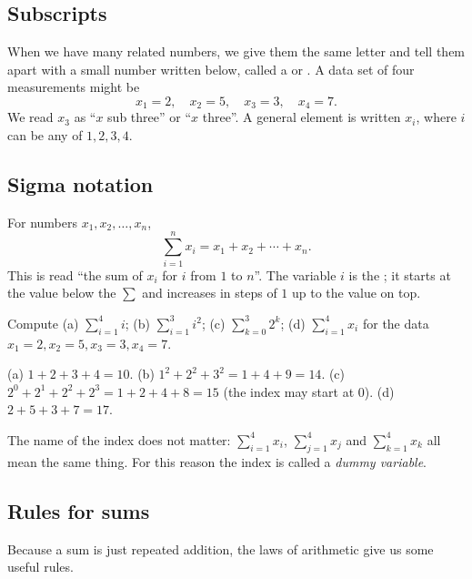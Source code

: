 \subsection{Subscripts}

When we have many related numbers, we give them the same letter and tell them
apart with a small number written below, called a  or
. A data set of four measurements might be
\[
  x_1 = 2,\quad x_2 = 5,\quad x_3 = 3,\quad x_4 = 7 .
\]
We read $x_3$ as ``$x$ sub three'' or ``$x$ three''. A general element is
written $x_i$, where $i$ can be any of $1, 2, 3, 4$.

\subsection{Sigma notation}

\begin{definition}\label{def:summation}
For numbers $x_1, x_2, \dots, x_n$,
\[
  \sum_{i=1}^{n} x_i = x_1 + x_2 + \cdots + x_n .
\]
This is read ``the sum of $x_i$ for $i$ from $1$ to $n$''. The variable $i$ is
the ; it starts at the value
below the $\sum$ and increases in steps of $1$ up to the value on top.
\end{definition}

\begin{example}\label{ex:sums}
Compute (a) $\sum_{i=1}^{4} i$; (b) $\sum_{i=1}^{3} i^2$;
(c) $\sum_{k=0}^{3} 2^k$; (d) $\sum_{i=1}^4 x_i$ for the data
$x_1 = 2, x_2 = 5, x_3 = 3, x_4 = 7$.

\sol
(a) $1 + 2 + 3 + 4 = 10$.
(b) $1^2 + 2^2 + 3^2 = 1 + 4 + 9 = 14$.
(c) $2^0 + 2^1 + 2^2 + 2^3 = 1 + 2 + 4 + 8 = 15$ (the index may start at $0$).
(d) $2 + 5 + 3 + 7 = 17$.
\end{example}

The name of the index does not matter: $\sum_{i=1}^4 x_i$, $\sum_{j=1}^4 x_j$
and $\sum_{k=1}^4 x_k$ all mean the same thing. For this reason the index is
called a \emph{dummy variable}.

\subsection{Rules for sums}

Because a sum is just repeated addition, the laws of arithmetic give us some
useful rules.

